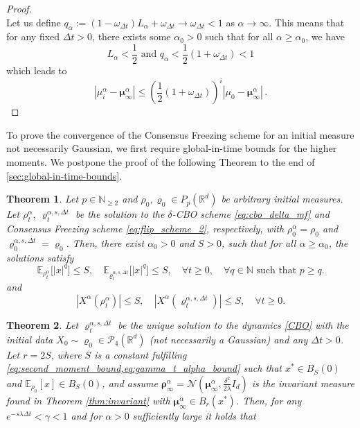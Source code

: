 \documentclass[reqno]{amsart}
\numberwithin{algorithm}{section}
\newcommand{\RR}{\mathbb{R}}
\newcommand{\EE}{{\mathbb E}}
\newcommand{\Xalpha}{{X^\alpha}}
\newcommand{\NN}{{\mathbb N}}
\newcommand{\mc}[1]{\mathcal{#1}}
\newtheorem{theorem}{Theorem}[section]
\begin{document}
{\begin{proof}
\begin{equation}
\end{equation}
Let us define $q_\alpha:=(1-\omega_{\Delta t})L_\alpha+\omega_{\Delta t}\to \omega_{\Delta t}<1$ as $\alpha \to\infty$. This means that for any fixed $\Delta t>0$, there exists some $\alpha_0>0$ such that for all $\alpha\geq \alpha_0$, we have
\begin{equation}
    L_\alpha<\frac{1}{2} \mbox{ and } q_\alpha<\frac{1}{2}(1+\omega_{\Delta t})<1 
\end{equation}
which leads to
\begin{equation}
     |\mu_i^\alpha-\boldsymbol\mu_\infty^\alpha|\leq \left(\frac{1}{2}(1+\omega_{\Delta t})\right)^i|\mu_0-\boldsymbol\mu_\infty^\alpha|\,.
\end{equation}
\end{proof}
To prove the convergence of the Consensus Freezing scheme for an initial measure not necessarily Gaussian, we first require global-in-time bounds for the {higher} moments. We postpone the proof of the following Theorem to the end of \cref{sec:global-in-time-bounds}.
\begin{theorem}\label{thm:global_bound}
   {Let $p \in \NN_{\geq 2}$ and $\rho_0,\varrho_0 \in P_p(\RR^d)$ be arbitrary initial measures.} 
    Let $\rho_t^\alpha, \ \varrho^{\alpha,s,\Delta t}_t$ be the solution to the $\delta$-CBO scheme \eqref{eq:cbo_delta_mf} and Consensus Freezing scheme \eqref{eq:flip_scheme_2}, respectively, with $\rho_0^\alpha = \rho_0$ and $ \varrho^{\alpha,s,\Delta t}_0 = \varrho_0$. Then, there exist $\alpha_0 > 0$ and $S > 0$, such
    that for all $\alpha \geq \alpha_0$, the solutions satisfy
    {
    \begin{equation}\label{eq:second_moment_bound}
        \EE_{\rho_t^\alpha} \big[ |x|^q \big] \leq S, \quad \EE_{\varrho_t^{\alpha,s,\Delta t}} \big[ |x|^q \big] \leq S, \quad \forall t \geq 0, \quad \forall q \in \NN \text{ such that } p \geq q.
    \end{equation}
    }
    and
    \begin{equation}\label{eq:gamma_t_alpha_bound}
        |\Xalpha(\rho_t^\alpha)| \leq S, \quad |\Xalpha(\varrho_t^{\alpha,s,\Delta t})| \leq S, \quad \forall t \geq 0.
    \end{equation}
\end{theorem}
\begin{theorem}\label{thm:fsconv}
    Let $\varrho_{t}^{\alpha,s,\Delta t}$ be the unique solution to the dynamics \eqref{CBO} with the initial data $X_0\sim \varrho_0 {\in \mathcal{P}_4(\RR^d)}$ (not necessarily a Gaussian) and any $\Delta t>0$. {Let $r=2S$}, {where $S$ is a constant fulfilling \cref{eq:second_moment_bound,eq:gamma_t_alpha_bound} such that $x^* \in B_S(0)$ and $\EE_{\rho_0}[x] \in B_S(0)$}, and assume  $\boldsymbol\rho_\infty^\alpha=\mc{N}(\boldsymbol\mu_\infty^\alpha,\frac{\delta^2}{2\lambda}I_d)$ is the invariant measure found in Theorem \ref{thm:invariant} {with $\boldsymbol\mu_\infty^\alpha\in B_r(x^*)$}. Then, for {any $  e^{-s \lambda \Delta t}<\gamma<1$} and for $\alpha>0$ sufficiently large it holds that

\end{theorem}}
\end{document}
